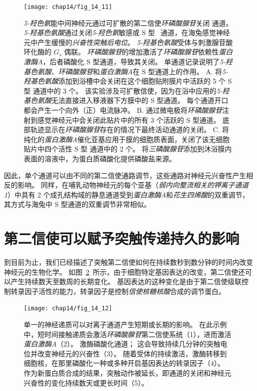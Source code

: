 \begin{figure}[htbp]
	\centering
	\texttt{[image: chap14/fig\_14\_11]}
	\caption{\textit{5-羟色氨}能中间神经元通过可扩散的第二信使\textit{环磷酸腺苷}关闭  通道。
		\textit{5-羟基色氨酸}通过关闭\textit{5-羟色氨}敏感或 S 型~ 通道，在海兔感觉神经元中产生缓慢的\textit{兴奋性突触后电位}。
		\textit{5-羟基色氨酸}受体与刺激腺苷酸环化酶的 $ G_s $ 偶联。
		\textit{环磷酸腺苷}的增加激活了\textit{环磷酸腺苷}依赖性\textit{蛋白激酶A}，后者磷酸化 S 型通道，导致其关闭。
		单通道记录说明了\textit{5-羟基色氨酸}、\textit{环磷酸腺苷}和\textit{蛋白激酶A}在 S 型通道上的作用。
		A. 将\textit{5-羟基色氨酸}添加到浴槽中会关闭在这个细胞贴附膜片中活跃的 5 个 S 型  通道中的 3 个。
		该实验涉及可扩散信使，因为在浴中应用的\textit{5-羟基色氨酸}无法直接进入移液器下方膜中的 S 型通道。
		每个通道开口都会产生一个向外（正）电流脉冲\cite{siegelbaum1982serotonin}。
		B. 通过微电极将\textit{环磷酸腺苷}注射到感觉神经元中会关闭此贴片中的所有 3 个活跃的 S 型通道。
		底部轨迹显示在\textit{环磷酸腺苷}存在的情况下最终活动通道的关闭\cite{siegelbaum1982serotonin}。
		C. 将纯化的\textit{蛋白激酶A}催化亚基应用于膜的细胞质表面，关闭了该无细胞贴片中四个活性 S 型  通道中的 2 个。
		将\textit{三磷酸腺苷}添加到沐浴膜内表面的溶液中，为蛋白质磷酸化提供磷酸盐来源\cite{shuster1985cyclic}。}
	\label{fig:14_11}
\end{figure}


因此，单个通道可以由不同的第二信使通路调节，这些通路对神经元兴奋性产生相反的影响。
同样，在哺乳动物神经元的每个亚基（\textit{弱内向整流相关的钾离子通道 1}）中具有 2 个成孔结构域的静息通道受到\textit{蛋白激酶A}和\textit{花生四烯酸}的双重调节，其方式与海兔中 S 型通道的双重调节非常相似。



\section{第二信使可以赋予突触传递持久的影响}

到目前为止，我们已经描述了突触第二信使如何在持续数秒到数分钟的时间内改变神经元的生物化学。
如图~\ref{fig:14_12}~所示，由于细胞特定基因表达的改变，第二信使还可以产生持续数天至数周的长期变化。
基因表达的这种变化是由于第二信使级联控制转录因子活性的能力，转录因子是控制\textit{信使核糖核酸}合成的调节蛋白。


\begin{figure}[htbp]
	\centering
	\texttt{[image: chap14/fig\_14\_12]}
	\caption{单一的神经递质可以对离子通道产生短期或长期的影响。
		在此示例中，短时间接触递质会激活\textit{环磷酸腺苷}第二信使系统（1），进而激活\textit{蛋白激酶A}（2）。
		激酶磷酸化通道；
		这会导致持续几分钟的突触电位并改变神经元的兴奋性（3）。
		随着受体的持续激活，激酶转移到细胞核，在那里磷酸化一种或多种开启基因表达的转录因子（4）。
		作为新蛋白质合成的结果，突触动作被延长，即通道的关闭和神经元兴奋性的变化持续数天或更长时间（5）。}
	\label{fig:14_12}
\end{figure}


